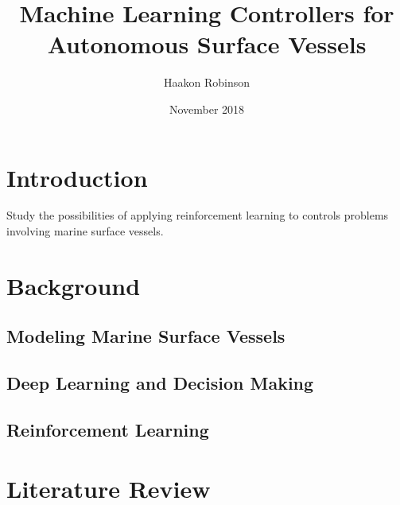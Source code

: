 \documentclass[titlepage]{elsarticle}
\title{Machine Learning Controllers for Autonomous Surface Vessels}
\author{Haakon Robinson}
\date{November 2018}
\begin{document}
\maketitle


\frontmatter
\begin{abstract}
  
\end{abstract}


\pagebreak
\tableofcontents
\pagebreak


\mainmatter
\section{Introduction}
\label{sec:intro}
Study the possibilities of applying reinforcement learning to controls
problems involving marine surface vessels.



\section{Background}
\label{sec:bg}

\subsection{Modeling Marine Surface Vessels}
\label{sec:bg-marine}

\subsection{Deep Learning and Decision Making}
\label{sec:bg-ml}

\subsection{Reinforcement Learning}
\label{sec:bg-rl}




\section{Literature Review}
\label{sec:lit}
\end{document}

